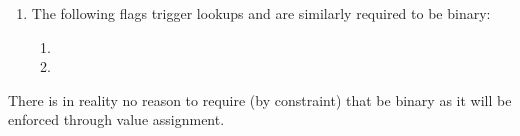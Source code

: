 \begin{enumerate}
\begin{enumerate}
			\item \txnDataHubTransactionTypeSupportsDelegationLists                 {}
			\item \txnDataHubRequiresEvmExecution                                   {}
			\item \txnDataHubCopyTxcd                                               {}
			\item \txnDataHubStatusCode                                             {}
			\item \txnDataHubEipBeaconRoot                                          {}
			\item \txnDataHubEipBlockHash                                           {}
		\end{enumerate}
	\item
		The following flags trigger lookups and are similarly required to be binary:
		\begin{enumerate}
			\item \txnDataCmptnEucFlag{}
			\item \txnDataCmptnWcpFlag{}
		\end{enumerate}
\end{enumerate}
\saNote{}
There is in reality no reason to require (by constraint) that \txnDataHubCopyTxcd{} be binary as it will be enforced through value assignment.
